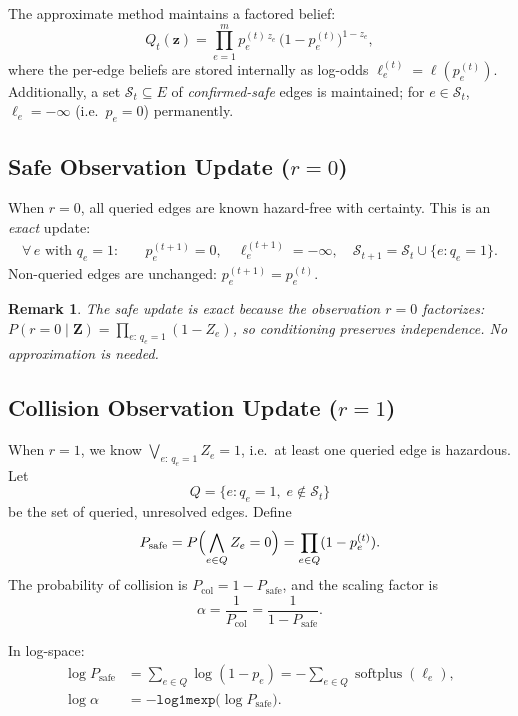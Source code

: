 \documentclass[11pt]{article}
\newcommand{\logodds}{\ell}
\DeclareMathOperator{\softplus}{softplus}
\newtheorem{remark}{Remark}
\begin{document}
The approximate method maintains a factored belief:
\[
  Q_t(\mathbf{z})
  = \prod_{e=1}^{m} p_e^{(t)\,z_e}\,\bigl(1-p_e^{(t)}\bigr)^{1-z_e},
\]
where the per-edge beliefs are stored internally as log-odds
$\ell_e^{(t)} = \logodds(p_e^{(t)})$.  Additionally, a set
$\mathcal{S}_t \subseteq E$ of \emph{confirmed-safe} edges is maintained;
for $e \in \mathcal{S}_t$, $\ell_e = -\infty$ (i.e.\ $p_e = 0$)
permanently.

\subsection{Safe Observation Update ($r = 0$)}

When $r = 0$, all queried edges are known hazard-free with certainty.
This is an \emph{exact} update:
\begin{align}
  \forall\, e \text{ with } q_e = 1:\quad
  &p_e^{(t+1)} = 0, \quad
   \ell_e^{(t+1)} = -\infty, \quad
   \mathcal{S}_{t+1} = \mathcal{S}_t \cup \{e : q_e = 1\}. \label{eq:approx-safe}
\end{align}
Non-queried edges are unchanged: $p_e^{(t+1)} = p_e^{(t)}$.

\begin{remark}
The safe update is exact because the observation $r=0$ factorizes:
$P(r{=}0 \mid \mathbf{Z}) = \prod_{e:\,q_e=1} (1 - Z_e)$, so conditioning
preserves independence.  No approximation is needed.
\end{remark}

\subsection{Collision Observation Update ($r = 1$)}
\label{sec:approx-collision}

When $r = 1$, we know $\bigvee_{e:\,q_e=1} Z_e = 1$, i.e.\ at least one
queried edge is hazardous.  Let
\[
  Q = \{e : q_e = 1,\; e \notin \mathcal{S}_t\}
\]
be the set of queried, unresolved edges.  Define
\[
  P_{\text{safe}}
  = P\Bigl(\bigwedge_{e \in Q} Z_e = 0\Bigr)
  = \prod_{e \in Q} (1 - p_e^{(t)}).
\]
The probability of collision is $P_{\text{col}} = 1 - P_{\text{safe}}$,
and the scaling factor is
\begin{equation}
  \alpha = \frac{1}{P_{\text{col}}} = \frac{1}{1 - P_{\text{safe}}}.
  \label{eq:alpha}
\end{equation}

In log-space:
\begin{align}
  \log P_{\text{safe}} &= \sum_{e \in Q} \log(1 - p_e) = -\sum_{e \in Q} \softplus(\ell_e), \label{eq:log-psafe} \\
  \log \alpha &= -\texttt{log1mexp}\bigl(\log P_{\text{safe}}\bigr). \label{eq:log-alpha}
\end{align}
\end{document}
